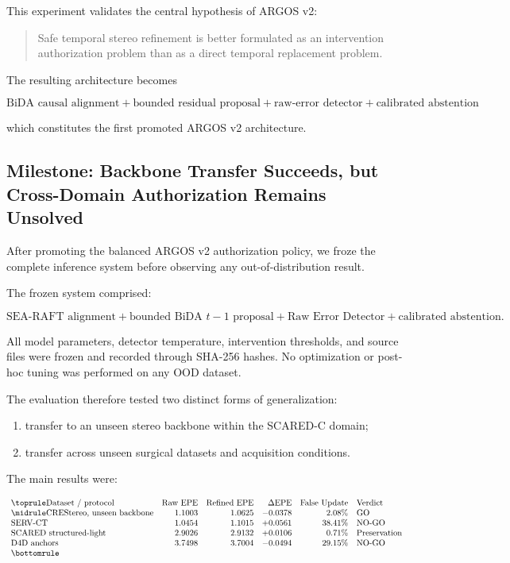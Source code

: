 \documentclass[11pt,a4paper]{article}
\begin{document}
This experiment validates the central hypothesis of ARGOS v2:

\begin{quote}
Safe temporal stereo refinement is better formulated as an intervention authorization problem than as a direct temporal replacement problem.
\end{quote}

The resulting architecture becomes

\[
\boxed{
\text{BiDA causal alignment}
+
\text{bounded residual proposal}
+
\text{raw-error detector}
+
\text{calibrated abstention}
}
\]

which constitutes the first promoted ARGOS v2 architecture.

\subsection{Milestone: Backbone Transfer Succeeds, but Cross-Domain Authorization Remains Unsolved}

After promoting the balanced ARGOS v2 authorization policy, we froze the complete inference system before observing any out-of-distribution result.

The frozen system comprised:

\[
\text{SEA-RAFT alignment}
+
\text{bounded BiDA } t-1 \text{ proposal}
+
\text{Raw Error Detector}
+
\text{calibrated abstention}.
\]

All model parameters, detector temperature, intervention thresholds, and source files were frozen and recorded through SHA-256 hashes. No optimization or post-hoc tuning was performed on any OOD dataset.

The evaluation therefore tested two distinct forms of generalization:

\begin{enumerate}
    \item transfer to an unseen stereo backbone within the SCARED-C domain;
    \item transfer across unseen surgical datasets and acquisition conditions.
\end{enumerate}

The main results were:

\[
\begin{array}{lrrrrl}
\toprule
\text{Dataset / protocol}
&
\text{Raw EPE}
&
\text{Refined EPE}
&
\Delta\text{EPE}
&
\text{False Update}
&
\text{Verdict}
\\
\midrule
\text{CREStereo, unseen backbone}
& 1.1003 & 1.0625 & -0.0378 & 2.08\% & \text{GO}
\\
\text{SERV-CT}
& 1.0454 & 1.1015 & +0.0561 & 38.41\% & \text{NO-GO}
\\
\text{SCARED structured-light}
& 2.9026 & 2.9132 & +0.0106 & 0.71\% & \text{Preservation}
\\
\text{D4D anchors}
& 3.7498 & 3.7004 & -0.0494 & 29.15\% & \text{NO-GO}
\\
\bottomrule
\end{array}
\]
\end{document}
